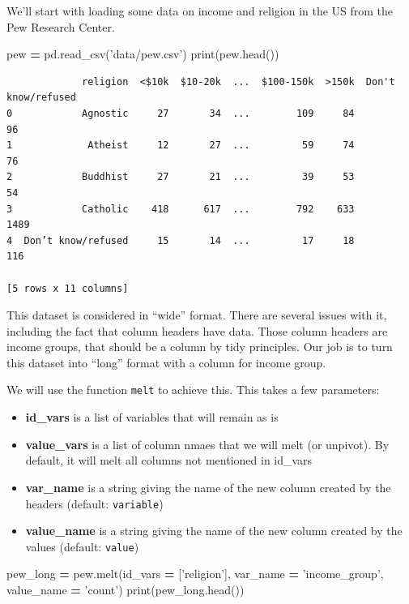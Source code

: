 \documentclass[
  letterpaper,
]{scrbook}
\newenvironment{Shaded}{\begin{snugshade}}{\end{snugshade}}
\newcommand{\BuiltInTok}[1]{#1}
\newcommand{\NormalTok}[1]{#1}
\newcommand{\OperatorTok}[1]{\textcolor[rgb]{0.81,0.36,0.00}{\textbf{#1}}}
\newcommand{\StringTok}[1]{\textcolor[rgb]{0.31,0.60,0.02}{#1}}
\providecommand{\tightlist}{%
  \setlength{\itemsep}{0pt}\setlength{\parskip}{0pt}}
\begin{document}
We'll start with loading some data on income and religion in the US from the Pew Research Center.

\begin{Shaded}
\begin{Highlighting}[]
\NormalTok{pew }\OperatorTok{=}\NormalTok{ pd.read_csv(}\StringTok{'data/pew.csv'}\NormalTok{)}
\BuiltInTok{print}\NormalTok{(pew.head())}
\end{Highlighting}
\end{Shaded}

\begin{verbatim}
             religion  <$10k  $10-20k  ...  $100-150k  >150k  Don't know/refused
0            Agnostic     27       34  ...        109     84                  96
1             Atheist     12       27  ...         59     74                  76
2            Buddhist     27       21  ...         39     53                  54
3            Catholic    418      617  ...        792    633                1489
4  Don’t know/refused     15       14  ...         17     18                 116

[5 rows x 11 columns]
\end{verbatim}

This dataset is considered in ``wide'' format. There are several issues with it, including the fact that column headers have data. Those column headers are income groups, that should be a column by tidy principles. Our job is to turn this dataset into ``long'' format with a column for income group.

We will use the function \texttt{melt} to achieve this. This takes a few parameters:

\begin{itemize}
\tightlist
\item
  \textbf{id\_vars} is a list of variables that will remain as is
\item
  \textbf{value\_vars} is a list of column nmaes that we will melt (or unpivot). By default, it will melt all columns not mentioned in id\_vars
\item
  \textbf{var\_name} is a string giving the name of the new column created by the headers (default: \texttt{variable})
\item
  \textbf{value\_name} is a string giving the name of the new column created by the values (default: \texttt{value})
\end{itemize}

\begin{Shaded}
\begin{Highlighting}[]
\NormalTok{pew_long }\OperatorTok{=}\NormalTok{ pew.melt(id_vars }\OperatorTok{=}\NormalTok{ [}\StringTok{'religion'}\NormalTok{], var_name }\OperatorTok{=} \StringTok{'income_group'}\NormalTok{, value_name }\OperatorTok{=} \StringTok{'count'}\NormalTok{)}
\BuiltInTok{print}\NormalTok{(pew_long.head())}
\end{Highlighting}
\end{Shaded}
\end{document}
